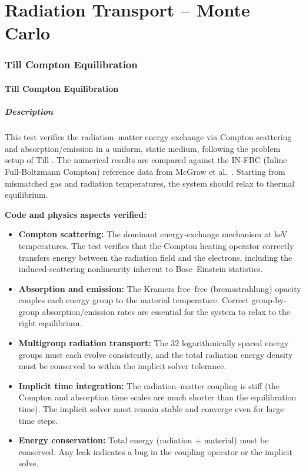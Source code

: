 \documentclass[11pt,a4paper]{article}
\begin{document}
\newpage


\part{Radiation Transport -- Monte Carlo}
\setcounter{section}{0}
\newpage

\section{Till Compton Equilibration}
\label{sec:till_compton_group}

\subsection{Till Compton Equilibration}
\label{sec:till_compton}

\subsubsection*{Description}
This test verifies the radiation--matter energy exchange via Compton scattering and absorption/emission in a uniform, static medium, following the problem setup of Till \cite{till2021}. The numerical results are compared against the IN-FBC (Inline Full-Boltzmann Compton) reference data from McGraw et al.\ \cite{mcgraw2023}. Starting from mismatched gas and radiation temperatures, the system should relax to thermal equilibrium.

\textbf{Code and physics aspects verified:}
\begin{itemize}
  \item \textbf{Compton scattering:} The dominant energy-exchange mechanism at keV temperatures. The test verifies that the Compton heating operator correctly transfers energy between the radiation field and the electrons, including the induced-scattering nonlinearity inherent to Bose--Einstein statistics.
  \item \textbf{Absorption and emission:} The Kramers free--free (bremsstrahlung) opacity couples each energy group to the material temperature. Correct group-by-group absorption/emission rates are essential for the system to relax to the right equilibrium.
  \item \textbf{Multigroup radiation transport:} The 32 logarithmically spaced energy groups must each evolve consistently, and the total radiation energy density must be conserved to within the implicit solver tolerance.
  \item \textbf{Implicit time integration:} The radiation--matter coupling is stiff (the Compton and absorption time scales are much shorter than the equilibration time). The implicit solver must remain stable and converge even for large time steps.
  \item \textbf{Energy conservation:} Total energy (radiation + material) must be conserved. Any leak indicates a bug in the coupling operator or the implicit solve.
\end{itemize}
\end{document}
